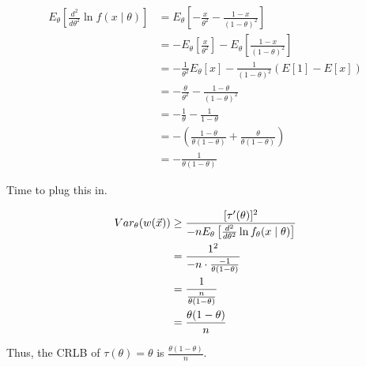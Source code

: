 \begin{align*}
	E_{\theta}\left[ \frac{d^2}{d\theta^2} \ln f(x \mid \theta) \right] &= E_{\theta}\left[ -\frac{x}{\theta^2} - \frac{1-x}{(1-\theta)^2}  \right] \\
	&= -E_{\theta}\left[ \frac{x}{\theta^2} \right] - E_{\theta}\left[ \frac{1-x}{(1-\theta)^2} \right] \\
	&= -\frac{1}{\theta^2} E_{\theta}[x] - \frac{1}{(1-\theta)^2}\left( E[1] - E[x] \right) \\
	&= -\frac{\theta}{\theta^2} - \frac{1-\theta}{(1-\theta)^2} \\
	&= -\frac{1}{\theta} - \frac{1}{1-\theta} \\
	&= -\left( \frac{1-\theta}{\theta(1-\theta)} + \frac{\theta}{\theta(1-\theta)} \right) \\
	&= -\frac{1}{\theta(1-\theta)}
\end{align*}

Time to plug this in.

\begin{align*}
	Var_{\theta}(w(\vec{x})) &\geq \frac{[\tau'(\theta)]^2}{-n E_{\theta}\left[ \frac{d^2}{d\theta^2} \ln f_{\theta}(x \mid \theta) \right]} \\
	&= \frac{1^2}{-n \cdot \frac{-1}{\theta(1-\theta)}} \\
	&= \frac{1}{\frac{n}{\theta(1-\theta)}} \\
	&= \frac{\theta(1-\theta)}{n}
\end{align*}

Thus, the CRLB of $\tau(\theta) = \theta$ is $\frac{\theta(1-\theta)}{n}$.
